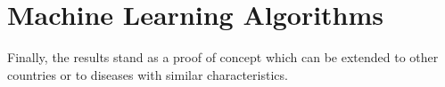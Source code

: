 \section{Machine Learning Algorithms}


Finally, the results stand as a proof of concept which can be extended to other countries or to diseases with similar characteristics.


